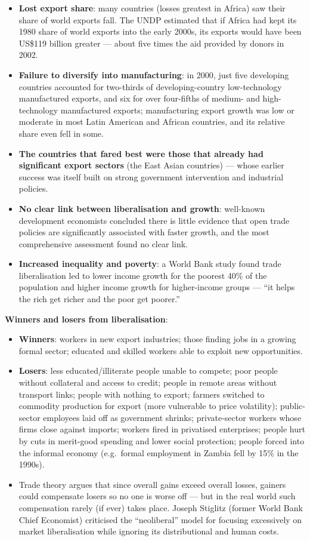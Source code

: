 \documentclass[a4paper,12pt]{article}
\begin{document}
\begin{itemize}
  \item \textbf{Lost export share}: many countries (losses greatest in Africa) saw their share of world exports fall. The UNDP estimated that if Africa had kept its 1980 share of world exports into the early 2000s, its exports would have been US\$119 billion greater --- about five times the aid provided by donors in 2002.
  \item \textbf{Failure to diversify into manufacturing}: in 2000, just five developing countries accounted for two-thirds of developing-country low-technology manufactured exports, and six for over four-fifths of medium- and high-technology manufactured exports; manufacturing export growth was low or moderate in most Latin American and African countries, and its relative share even fell in some.
  \item \textbf{The countries that fared best were those that already had significant export sectors} (the East Asian countries) --- whose earlier success was itself built on strong government intervention and industrial policies.
  \item \textbf{No clear link between liberalisation and growth}: well-known development economists concluded there is little evidence that open trade policies are significantly associated with faster growth, and the most comprehensive assessment found no clear link.
  \item \textbf{Increased inequality and poverty}: a World Bank study found trade liberalisation led to lower income growth for the poorest 40\% of the population and higher income growth for higher-income groups --- ``it helps the rich get richer and the poor get poorer.''
\end{itemize}
\textbf{Winners and losers from liberalisation}:
\begin{itemize}
  \item \textbf{Winners}: workers in new export industries; those finding jobs in a growing formal sector; educated and skilled workers able to exploit new opportunities.
  \item \textbf{Losers}: less educated/illiterate people unable to compete; poor people without collateral and access to credit; people in remote areas without transport links; people with nothing to export; farmers switched to commodity production for export (more vulnerable to price volatility); public-sector employees laid off as government shrinks; private-sector workers whose firms close against imports; workers fired in privatised enterprises; people hurt by cuts in merit-good spending and lower social protection; people forced into the informal economy (e.g.\ formal employment in Zambia fell by 15\% in the 1990s).
  \item Trade theory argues that since overall gains exceed overall losses, gainers could compensate losers so no one is worse off --- but in the real world such compensation rarely (if ever) takes place. Joseph Stiglitz (former World Bank Chief Economist) criticised the ``neoliberal'' model for focusing excessively on market liberalisation while ignoring its distributional and human costs.
\end{itemize}
\end{document}
